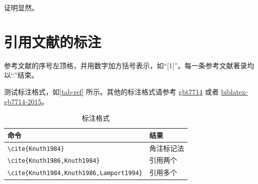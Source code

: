 \begin{remark}
    证明显然。
\end{remark}

\section{引用文献的标注}

参考文献的序号左顶格，并用数字加方括号表示，如“[1]”。每一条参考文献著录均以“.”结束。

测试标注格式，如\autoref{tab-ref} 所示。其他的标注格式请参考 \href{http://mirrors.ctan.org/biblio/bibtex/contrib/gbt7714/gbt7714.pdf}{gbt7714} 或者
\href{http://mirrors.ctan.org/macros/latex/contrib/biblatex-contrib/biblatex-gb7714-2015/biblatex-gb7714-2015.pdf}{biblatex-gb7714-2015}。

\begin{table}
    \centering
    \caption{标注格式}
    \label{tab-ref}
    \begin{tabular}{ll}
        \toprule
        命令                                            & 结果                                         \\
        \midrule
        \verb|\cite{Knuth1984}|                       & 角注标记法\cite{Knuth1984}                      \\
        \verb|\cite{Knuth1986,Knuth1984}|             & 引用两个\cite{Knuth1986,Knuth1984}             \\
        \verb|\cite{Knuth1984,Knuth1986,Lamport1994}| & 引用多个\cite{Knuth1984,Knuth1986,Lamport1994} \\
        \bottomrule
    \end{tabular}
\end{table}
